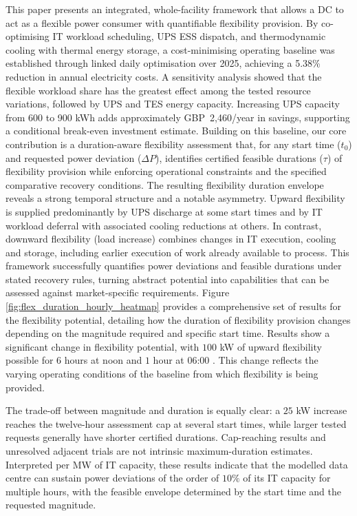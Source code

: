 \documentclass[lettersize,journal]{IEEEtran}
\providecommand{\DIFadd}[1]{{\color{blue}#1}}
\providecommand{\DIFaddbegin}{}
\providecommand{\DIFaddend}{}
\begin{document}
This paper presents an integrated, whole-facility framework that  \DIFaddbegin \DIFadd{allows a DC to act as a flexible power consumer with }\DIFaddend quantifiable flexibility provision. By co-optimising IT workload scheduling,  \DIFaddbegin \DIFadd{UPS ESS }\DIFaddend dispatch, and thermodynamic cooling with thermal energy storage, a cost-minimising  \DIFaddbegin \DIFadd{operating baseline was established through linked daily optimisation over 2025}\DIFaddend , achieving a  \DIFaddbegin \DIFadd{5.38}\DIFaddend \% reduction in  \DIFaddbegin \DIFadd{annual electricity costs. A sensitivity analysis showed that the flexible workload share has the greatest effect among the tested resource variations, followed by UPS and TES energy capacity. Increasing UPS capacity from 600 to 900 kWh adds approximately GBP~2,460/year in savings, supporting a conditional break-even investment estimate. }\DIFaddend Building on this baseline, our core contribution is a duration-aware flexibility assessment that, for any start time ($t_0$) and requested power deviation ($\Delta P$),  \DIFaddbegin \DIFadd{identifies certified feasible durations }\DIFaddend ($\tau$) of flexibility provision while enforcing operational constraints and  \DIFaddbegin \DIFadd{the specified comparative recovery conditions}\DIFaddend . The resulting flexibility duration envelope reveals a strong temporal structure and a notable asymmetry. Upward flexibility  \DIFaddbegin \DIFadd{is supplied predominantly by UPS discharge at some start times and by IT workload deferral with associated cooling reductions at others. }\DIFaddend In contrast, downward flexibility (load increase)  \DIFaddbegin \DIFadd{combines changes in IT execution, cooling and storage, including earlier execution of work already available to process}\DIFaddend . This framework successfully quantifies  \DIFaddbegin \DIFadd{power deviations and feasible durations under stated recovery rules}\DIFaddend , turning abstract potential into  \DIFaddbegin \DIFadd{capabilities that can be assessed against market-specific requirements}\DIFaddend . Figure \ref{fig:flex_duration_hourly_heatmap} provides a comprehensive set of results for the flexibility potential, detailing how the duration of flexibility provision changes depending on the magnitude required and specific start time. Results show a significant change in flexibility potential, with $100$ kW of upward flexibility possible for  \DIFaddbegin \DIFadd{$6$ hours at noon and $1$ hour at $06$:}\DIFaddend $00$ . This change reflects the varying operating conditions of the baseline from which flexibility is being provided. \DIFaddbegin \DIFadd{The trade-off between magnitude and duration is equally clear: a $25$ kW increase reaches the twelve-hour assessment cap at several start times, while larger tested requests generally have shorter certified durations. Cap-reaching results and unresolved adjacent trials are not intrinsic maximum-duration estimates. Interpreted per MW of IT capacity, these results indicate that the modelled data centre can sustain power deviations of the order of $10\%$ of its IT capacity for multiple hours, with the feasible envelope determined by the start time and the requested magnitude.

}\DIFaddend 
\end{document}
